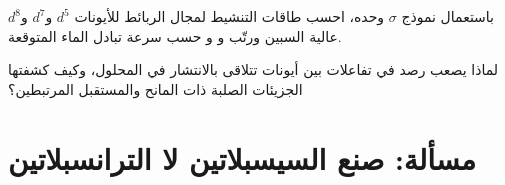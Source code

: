 \begin{exercise}[$\star\star\star$]\label{exo:b3:complex-mechanisms:11}
باستعمال نموذج $\sigma$ وحده، احسب طاقات التنشيط لمجال الربائط للأيونات
$d^5$ و$d^7$ و$d^8$ عالية السبين ورتّب  و و حسب سرعة
تبادل الماء المتوقعة.
\end{exercise}

\begin{exercise}[$\star\star\star$]\label{exo:b3:complex-mechanisms:12}
لماذا يصعب رصد  في تفاعلات بين أيونات
تتلاقى بالانتشار في المحلول، وكيف كشفتها الجزيئات الصلبة ذات المانح والمستقبل
المرتبطين؟
\end{exercise}

\section{مسألة: صنع السيسبلاتين لا الترانسبلاتين}

